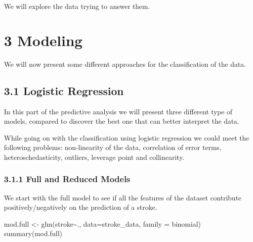 \documentclass[
]{article}
\newenvironment{Shaded}{\begin{snugshade}}{\end{snugshade}}
\newcommand{\AttributeTok}[1]{\textcolor[rgb]{0.77,0.63,0.00}{#1}}
\newcommand{\FunctionTok}[1]{\textcolor[rgb]{0.00,0.00,0.00}{#1}}
\newcommand{\NormalTok}[1]{#1}
\newcommand{\OtherTok}[1]{\textcolor[rgb]{0.56,0.35,0.01}{#1}}
\newcommand{\SpecialCharTok}[1]{\textcolor[rgb]{0.00,0.00,0.00}{#1}}
\begin{document}
We will explore the data trying to answer them.

\hypertarget{modeling}{%
\section{3 Modeling}\label{modeling}}

We will now present some different approaches for the classification of
the data.

\hypertarget{logistic-regression}{%
\subsection{3.1 Logistic Regression}\label{logistic-regression}}

In this part of the predictive analysis we will present three different
type of models, compared to discover the best one that can better
interpret the data.

While going on with the classification using logistic regression we
could meet the following problems: non-linearity of the data,
correlation of error terms, heteroschedasticity, outliers, leverage
point and collinearity.

\hypertarget{full-and-reduced-models}{%
\subsubsection{3.1.1 Full and Reduced
Models}\label{full-and-reduced-models}}

We start with the full model to see if all the features of the dataset
contribute positively/negatively on the prediction of a stroke.

\begin{Shaded}
\begin{Highlighting}[]
\NormalTok{mod.full }\OtherTok{\textless{}{-}} \FunctionTok{glm}\NormalTok{(stroke}\SpecialCharTok{\textasciitilde{}}\NormalTok{., }\AttributeTok{data=}\NormalTok{stroke\_data, }\AttributeTok{family =}\NormalTok{ binomial)}
\FunctionTok{summary}\NormalTok{(mod.full)}
\end{Highlighting}
\end{Shaded}
\end{document}
